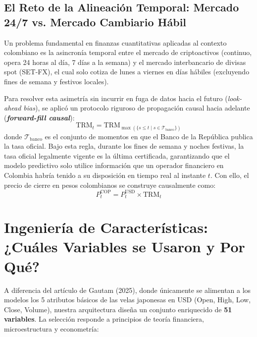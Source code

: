 \documentclass[12pt,letterpaper]{article}
\begin{document}
\subsection{El Reto de la Alineación Temporal: Mercado 24/7 vs. Mercado Cambiario Hábil}
Un problema fundamental en finanzas cuantitativas aplicadas al contexto colombiano es la asincronía temporal entre el mercado de criptoactivos (continuo, opera 24 horas al día, 7 días a la semana) y el mercado interbancario de divisas spot (SET-FX), el cual solo cotiza de lunes a viernes en días hábiles (excluyendo fines de semana y festivos locales).

Para resolver esta asimetría sin incurrir en fuga de datos hacia el futuro (\textit{look-ahead bias}), se aplicó un protocolo riguroso de propagación causal hacia adelante (\textbf{\textit{forward-fill causal}}):
\begin{equation}
\text{TRM}_t = \text{TRM}_{\max(\{s \le t \mid s \in \mathcal{T}_{\text{banco}}\})}
\end{equation}
donde $\mathcal{T}_{\text{banco}}$ es el conjunto de momentos en que el Banco de la República publica la tasa oficial. Bajo esta regla, durante los fines de semana y noches festivas, la tasa oficial legalmente vigente es la última certificada, garantizando que el modelo predictivo solo utilice información que un operador financiero en Colombia habría tenido a su disposición en tiempo real al instante $t$. Con ello, el precio de cierre en pesos colombianos se construye causalmente como:
\begin{equation}
P_t^{\text{COP}} = P_t^{\text{USD}} \times \text{TRM}_t
\end{equation}

\section{Ingeniería de Características: ¿Cuáles Variables se Usaron y Por Qué?}

A diferencia del artículo de Gautam (2025), donde únicamente se alimentan a los modelos los 5 atributos básicos de las velas japonesas en USD (Open, High, Low, Close, Volume), nuestra arquitectura diseña un conjunto enriquecido de \textbf{51 variables}. La selección responde a principios de teoría financiera, microestructura y econometría:
\end{document}
